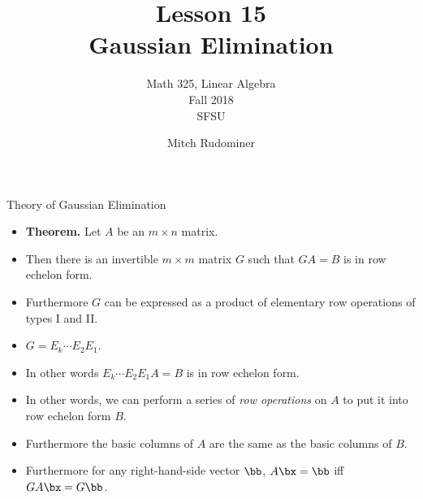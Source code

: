 \documentclass{beamer}
\title{Lesson 15 \\ Gaussian Elimination}
\subtitle{Math 325, Linear Algebra \\ Fall 2018 \\ SFSU}
\author{Mitch Rudominer}
\date{}
\begin{document}
\begin{frame}
  \titlepage
\end{frame}


\begin{frame}{Theory of Gaussian Elimination}

\begin{itemize}
\item \textbf{Theorem.} Let $A$ be an $m\times n$ matrix.
\item Then there is an invertible $m\times m$ matrix $G$ such that
$GA = B$ is in row echelon form.
\item Furthermore $G$ can be expressed as a product of elementary row operations
of types I and II.
\item $G = E_k \cdots E_2 E_1$.
\item In other words $E_k \cdots E_2 E_1 A = B$ is in row echelon form.
\item In other words, we can perform a series of \emph{row operations} on $A$ to
put it into row echelon form $B$.
\item Furthermore the basic columns of $A$ are the same as the basic columns
of $B$.
\item Furthermore for any right-hand-side vector $\bb$, $A\bx=\bb$ iff
$GA\bx=G\bb$.
\end{itemize}
\end{frame}



\end{document}
